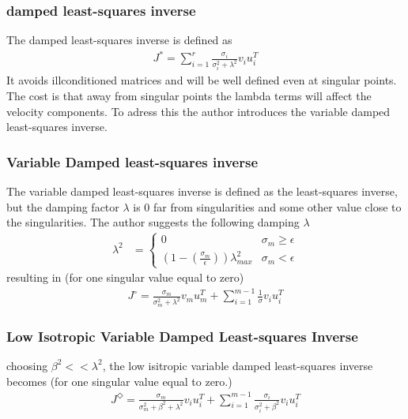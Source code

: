 \subsubsection{damped least-squares inverse}
The damped least-squares inverse is defined as
\begin{align}
    J^{\ast}= \sum_{i=1}^r \frac{\sigma_i}{\sigma_i^2 + \lambda^2} v_i u_i^T
\end{align}
It avoids illconditioned matrices and will be well defined even at singular points. The cost is that away from singular points the lambda terms will affect the velocity components. To adress this the author introduces the variable damped least-squares inverse.

\subsubsection{Variable Damped least-squares inverse}

The variable damped least-squares inverse is defined as the least-squares inverse, but the damping factor $\lambda$ is $0$ far from singularities and some other value close to the singularities. The author suggests the following damping $\lambda$
\begin{align}
    \lambda^2 &= 
    \begin{cases}
        0 & \sigma_m \geq \epsilon \\ 
        \left(1-\left(\frac{\sigma_m}{\epsilon}\right)\right)\lambda_{max}^2 & \sigma_m < \epsilon 
    \end{cases}
\end{align}
resulting in (for one singular value equal to zero)
\begin{align}
    J^{\circ} = \frac{\sigma_m}{\sigma_m^2 + \lambda^2}v_m u_m^T + \sum_{i=1}^{m-1} \frac{1}{\sigma}v_i u_i^T
\end{align}

\subsubsection{Low Isotropic Variable Damped Least-squares Inverse}
choosing $\beta^2 << \lambda^2$, the low isitropic variable damped least-squares inverse becomes (for one singular value equal to zero.)
\begin{align}
    J^{\Diamond} = \frac{\sigma_m}{\sigma_m^2 + \beta^2 + \lambda^2}v_i u_i^T +\sum_{i=1}^{m-1}\frac{\sigma_i}{\sigma_i^2+\beta^2} v_i u_i^T
\end{align}

